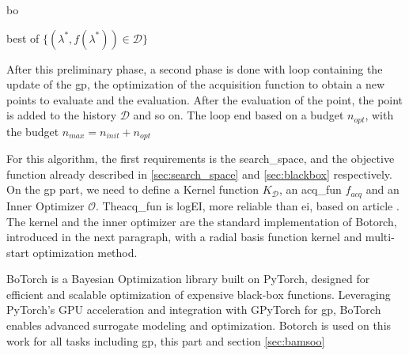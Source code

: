 \begin{algorithm}[H]
    \caption{\acrshort{bo}}
    \label{algo:bo}
    
    
    \Return best of $\{(\lambda^*, f(\lambda^*)) \in \mathcal{D}\}$
\end{algorithm}

After this preliminary phase, a second phase is done with loop containing the update of the \acrshort{gp}, the optimization of the acquisition function to obtain a new points to evaluate and the evaluation. After the evaluation of the point, the point is added to the history $\mathcal D$ and so on. The loop end based on a budget $n_{opt}$, with the budget $n_{max}=n_{init}+n_{opt}$

For this algorithm, the first requirements is the \gls{search_space}, and the objective function already described in \ref{sec:search_space} and \ref{sec:blackbox} respectively. On the \acrshort{gp} part, we need to define a Kernel function $K_\mathcal D$, an \gls{acq_fun} $f_{acq}$ and an Inner Optimizer $\mathcal O$. The\gls{acq_fun} is logEI, more reliable than \acrfull{ei}, based on article \cite{ament_unexpected_2024}. The kernel and the inner optimizer are the standard implementation of Botorch, introduced in the next paragraph, with a radial basis function kernel and multi-start optimization method. 

BoTorch \cite{balandat_botorch_2020} is a Bayesian Optimization library built on PyTorch, designed for efficient and scalable optimization of expensive black-box functions. Leveraging PyTorch's GPU acceleration and integration with GPyTorch \cite{gardner_gpytorch_2021} for \acrshort{gp}, BoTorch enables advanced surrogate modeling and optimization. Botorch is used on this work for all tasks including \acrshort{gp}, this part and section \ref{sec:bamsoo}


